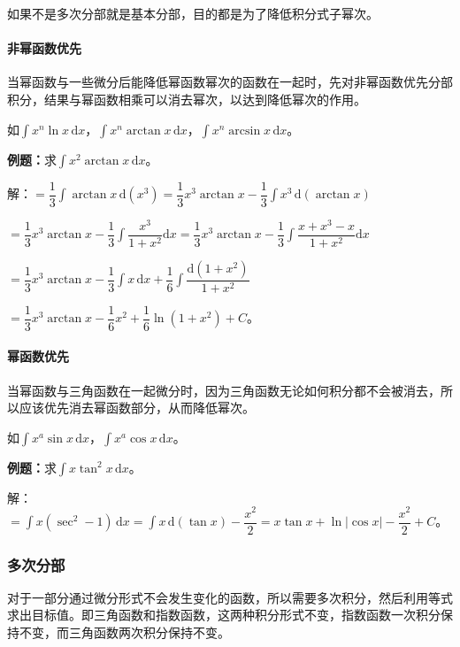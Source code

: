 \documentclass[UTF8, 12pt]{ctexart}
\begin{document}
如果不是多次分部就是基本分部，目的都是为了降低积分式子幂次。

\paragraph{非幂函数优先} \leavevmode \medskip

当幂函数与一些微分后能降低幂函数幂次的函数在一起时，先对非幂函数优先分部积分，结果与幂函数相乘可以消去幂次，以达到降低幂次的作用。

如$\int x^n\ln x\,\textrm{d}x$，$\int x^n\arctan x\,\textrm{d}x$，$\int x^n\arcsin x\,\textrm{d}x$。

\textbf{例题：}求$\int x^2\arctan x\,\textrm{d}x$。

解：$=\dfrac{1}{3}\int\arctan x\,\textrm{d}(x^3)=\dfrac{1}{3}x^3\arctan x-\dfrac{1}{3}\int x^3\,\textrm{d}(\arctan x)$

$=\dfrac{1}{3}x^3\arctan x-\dfrac{1}{3}\displaystyle{\int\dfrac{x^3}{1+x^2}\textrm{d}x}=\dfrac{1}{3}x^3\arctan x-\dfrac{1}{3}\displaystyle{\int\dfrac{x+x^3-x}{1+x^2}\textrm{d}x}$

$=\dfrac{1}{3}x^3\arctan x-\dfrac{1}{3}\int x\,\textrm{d}x+\displaystyle{\dfrac{1}{6}\int\dfrac{\textrm{d}(1+x^2)}{1+x^2}}$

$=\dfrac{1}{3}x^3\arctan x-\dfrac{1}{6}x^2+\dfrac{1}{6}\ln(1+x^2)+C$。

\paragraph{幂函数优先} \leavevmode \medskip

当幂函数与三角函数在一起微分时，因为三角函数无论如何积分都不会被消去，所以应该优先消去幂函数部分，从而降低幂次。

如$\int x^a\sin x\,\textrm{d}x$，$\int x^a\cos x\,\textrm{d}x$。

\textbf{例题：}求$\int x\tan^2x\,\textrm{d}x$。

解：$=\int x(\sec^2-1)\,\textrm{d}x=\int x\,\textrm{d}(\tan x)-\dfrac{x^2}{2}=x\tan x+\ln\vert\cos x\vert-\dfrac{x^2}{2}+C$。

\subsubsection{多次分部}

对于一部分通过微分形式不会发生变化的函数，所以需要多次积分，然后利用等式求出目标值。即三角函数和指数函数，这两种积分形式不变，指数函数一次积分保持不变，而三角函数两次积分保持不变。
\end{document}
